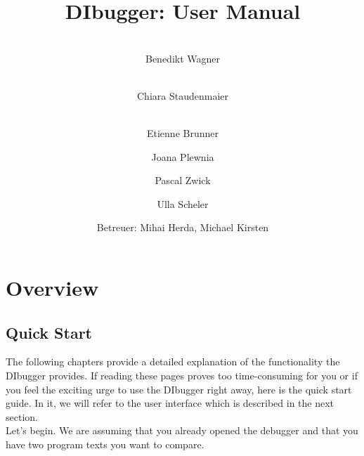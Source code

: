 \documentclass[parskip=full]{memoir}
\title{
	\vspace{2cm}
	\myfont 
	DIbugger: User Manual\\
}
\author{
	\vspace{1cm} \\
	Benedikt Wagner\\
	\and
	\vspace{1cm} \\ Chiara Staudenmaier\\
	\and 
		\vspace{1cm} \\
		Etienne Brunner\\
	\and Joana Plewnia\\
	\and Pascal Zwick\\
	\and Ulla Scheler\\
	\vspace{1cm}
	\and Betreuer: Mihai Herda, Michael Kirsten
	\vspace{4cm}
}
\begin{document}
\clearpage
\maketitle
{}
\newpage

\tableofcontents
{}

\chapter{Overview} %

\section{Quick Start}
The following chapters provide a detailed explanation of the functionality the DIbugger provides. If reading these pages proves too time-consuming for you or if you feel the exciting urge to use the DIbugger right away, here is the quick start guide. In it, we will refer to the user interface which is described in the next section. \\
Let's begin. We are assuming that you already opened the debugger and that you have two program texts you want to compare.
\end{document}
